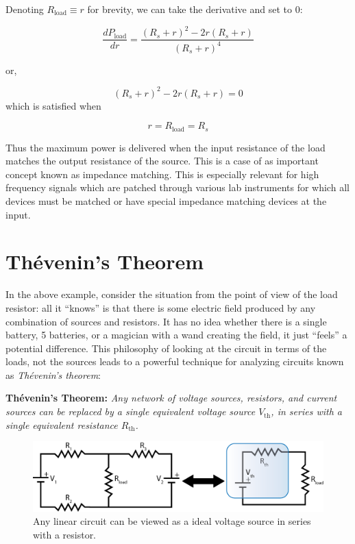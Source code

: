 \documentclass{tufte-book}
\begin{document}
\noindent Denoting $R_\text{load} \equiv r$ for brevity, we can take the derivative and set to 0:

$$
\frac{d P_\text{load}}{dr}  =  \frac{\left(R_s+r\right)^2 - 2r\left(R_s+r\right)}{\left(R_s+r\right)^4}
$$

\noindent or,

$$
\left(R_s+r\right)^2 - 2r\left(R_s+r\right) = 0
$$
\noindent which is satisfied when

\begin{equation}\label{eq:maxpow}
r = R_\text{load} = R_s
\end{equation}

Thus the maximum power is delivered when the input resistance of the load matches the output resistance of the source. This is a case of as important concept known as impedance matching. This is especially relevant for high frequency signals which are patched through various lab instruments for which all devices must be matched or have special impedance matching devices at the input.


\section{Th\'evenin's Theorem}
In the above example, consider the situation from the point of view of the load resistor: all it ``knows'' is that there is some electric field produced by any combination of sources and resistors. It has no idea whether there is a single battery, 5 batteries, or a magician with a wand creating the field, it just ``feels'' a potential difference. This philosophy of looking at the circuit in terms of the loads, not the sources leads to a powerful technique for analyzing circuits known as \textit{Th\'evenin's theorem}:

\noindent\textbf{Th\'evenin's Theorem:} \textit{Any network of voltage sources, resistors, and current sources can be replaced by a single equivalent voltage source $V_\text{th}$, in series with a single equivalent resistance $R_\text{th}$.}

\begin{figure}[h]
\caption{Any linear circuit can be viewed as a ideal voltage source in series with a resistor.}
\label{fig:thevenin}
\begin{center}
\includegraphics[width=\textwidth]{thevenin.png}
\end{center}
\end{figure}
\end{document}
